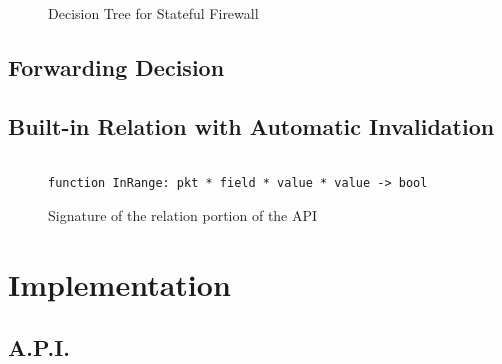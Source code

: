 \documentclass[12pt]{article}
\begin{document}
  \begin{figure}
\label{fig:decisiontree}  
\caption{Decision Tree for Stateful Firewall}     
\end{figure}
   

   

   \subsection*{Forwarding Decision}

   
   \subsection*{Built-in Relation with Automatic Invalidation}

   \begin{figure}
     \begin{lstlisting}
       
function InRange: pkt * field * value * value -> bool

\end{lstlisting}

\caption{Signature of the relation portion of the API}
\end{figure}

   
   
\section*{Implementation}

\subsection*{A.P.I.}
\end{document}
